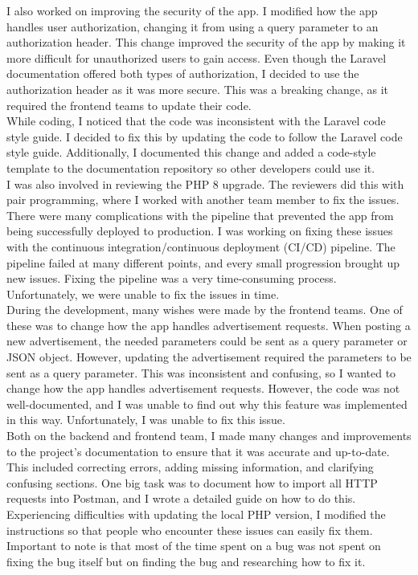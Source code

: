 \documentclass[sf-font,usefira,english]{uulm/sp/article}
\begin{document}
I also worked on improving the security of the app. 
I modified how the app handles user authorization, changing it from using a query parameter to an authorization header. 
This change improved the security of the app by making it more difficult for unauthorized users to gain access. 
Even though the Laravel documentation offered both types of authorization, I decided to use the authorization header as it was more secure. 
This was a breaking change, as it required the frontend teams to update their code.\\

While coding, I noticed that the code was inconsistent with the Laravel code style guide. 
I decided to fix this by updating the code to follow the Laravel code style guide. 
Additionally, I documented this change and added a code-style template to the documentation repository so other developers could use it.\\

I was also involved in reviewing the PHP 8 upgrade. 
The reviewers did this with pair programming, where I worked with another team member to fix the issues. 
There were many complications with the pipeline that prevented the app from being successfully deployed to production. 
I was working on fixing these issues with the continuous integration/continuous deployment (CI/CD) pipeline. 
The pipeline failed at many different points, and every small progression brought up new issues. 
Fixing the pipeline was a very time-consuming process. 
Unfortunately, we were unable to fix the issues in time.\\

During the development, many wishes were made by the frontend teams. 
One of these was to change how the app handles advertisement requests. 
When posting a new advertisement, the needed parameters could be sent as a query parameter or JSON object. 
However, updating the advertisement required the parameters to be sent as a query parameter. 
This was inconsistent and confusing, so I wanted to change how the app handles advertisement requests. 
However, the code was not well-documented, and I was unable to find out why this feature was implemented in this way. 
Unfortunately, I was unable to fix this issue.\\

Both on the backend and frontend team, I made many changes and improvements to the project’s documentation to ensure that it was accurate and up-to-date. 
This included correcting errors, adding missing information, and clarifying confusing sections. 
One big task was to document how to import all HTTP requests into Postman, and I wrote a detailed guide on how to do this. 
Experiencing difficulties with updating the local PHP version, I modified the instructions so that people who encounter these issues can easily fix them. 
Important to note is that most of the time spent on a bug was not spent on fixing the bug itself but on finding the bug and researching how to fix it.\\
\end{document}
